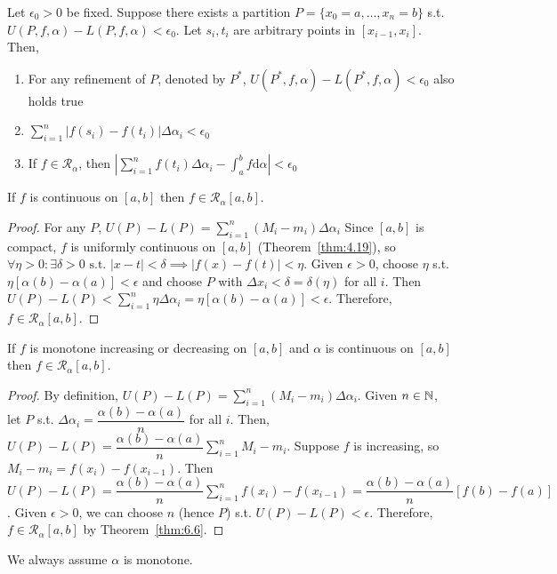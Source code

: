 \begin{thm}[7]
	Let $\epsilon_0>0$ be fixed. Suppose there exists a partition $P=\{x_0=a,\ldots ,x_n=b\} $ s.t. $U(P,f,\alpha)-L(P,f,\alpha)<\epsilon_0$.
	Let $s_{i},t_{i}$ are arbitrary points in $[x_{i-1},x_i]$.
	Then,
	\begin{enumerate}
		\item For any refinement of $P$, denoted by $P^{*}$, $U(P^{*},f,\alpha)-L(P^{*},f,\alpha)<\epsilon_0$ also holds true
		\item  $\sum_{i=1}^{n}{\left|f(s_i)-f(t_i)\right| \Delta \alpha_i}<\epsilon_0$
		\item If $f \in \mathscr{R}_{\alpha}$, then $\left| \sum_{i=1}^{n}{f(t_i) \Delta \alpha_i}-\int_{a}^{b}{f\mathrm{d}\alpha} \right| <\epsilon_0$
	\end{enumerate}
\end{thm}


\begin{thm}[8]
	If $f$ is continuous on $[a,b]$ then $f \in \mathscr{R}_{\alpha}[a,b]$.
	\begin{proof}
		For any $P$, $U(P)-L(P)=\sum_{i=1}^{n}{(M_i - m_i) \Delta \alpha_i}$
		Since $[a,b]$ is compact, $f$ is uniformly continuous on $[a,b]$ (Theorem~\ref{thm:4.19}), so $\forall{\eta > 0}: \exists{\delta > 0} \text{ s.t. } |x-t|<\delta \implies |f(x)-f(t)|<\eta$.
		Given $\epsilon > 0$, choose $\eta$ s.t. $\eta[\alpha(b)-\alpha(a)]<\epsilon$ and choose $P$ with $\Delta x_i<\delta=\delta(\eta)$ for all $i$.
		Then $U(P)-L(P)<\sum_{i=1}^{n}{\eta \Delta \alpha_i }=\eta[\alpha(b)-\alpha(a)]<\epsilon$.
		Therefore, $f \in \mathscr{R}_{\alpha}[a,b]$.
	\end{proof}
\end{thm}

\begin{thm}[9]
	If $f$ is monotone increasing or decreasing on $[a,b]$ and $\alpha$ is continuous on $[a,b]$ then $f \in \mathscr{R}_{\alpha}[a,b]$.
	\begin{proof}
		By definition, $U(P)-L(P)=\sum_{i=1}^{n}{(M_{i}-m_{i}) \Delta \alpha_i}$.
		Given $n \in \mathbb{N}$, let $P$ s.t. $\Delta \alpha_i = \dfrac{\alpha(b)-\alpha(a)}{n}$ for all $i$.
		Then, $U(P)-L(P)=\dfrac{\alpha(b)-\alpha(a)}{n} \sum_{i=1}^{n}{M_{i}-m_{i}}$.
		Suppose $f$ is increasing, so $M_i - m_i=f(x_i)-f(x_{i-1})$.
		Then $U(P)-L(P)=\dfrac{\alpha(b)-\alpha(a)}{n}\sum_{i=1}^{n}{f(x_i)-f(x_{i-1})}=\dfrac{\alpha(b)-\alpha(a)}{n}[f(b)-f(a)]$.
		Given $\epsilon>0$, we can choose $n$ (hence $P$) s.t. $U(P)-L(P)<\epsilon$. Therefore, $f \in \mathscr{R}_{\alpha}[a,b]$ by Theorem~\ref{thm:6.6}.
	\end{proof}
	\begin{note}
		We always assume $\alpha$ is monotone.
	\end{note}
\end{thm}

